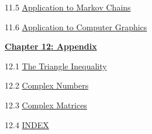 \documentclass{ximera}
\begin{document}
11.5	\href{https://ximera.osu.edu/linearalgebradzv3/LinearAlgebraInteractiveIntro/APP-0060/main}{Application to Markov Chains}
	
11.6	\href{https://ximera.osu.edu/linearalgebradzv3/LinearAlgebraInteractiveIntro/APP-0040/main}{Application to Computer Graphics}
	
\href{https://ximera.osu.edu/linearalgebradzv3/LinearAlgebraInteractiveIntro/XLAChapter_appendix/main}{\textbf{Chapter 12: Appendix}}
	
12.1	\href{https://ximera.osu.edu/linearalgebradzv3/LinearAlgebraInteractiveIntro/APX-0010/main}{The Triangle Inequality}
	
12.2	\href{https://ximera.osu.edu/linearalgebradzv3/LinearAlgebraInteractiveIntro/APX-0020/main}{Complex Numbers}
	
12.3
\href{https://ximera.osu.edu/linearalgebradzv3/LinearAlgebraInteractiveIntro/RTH-0050/main}{Complex Matrices}
	
12.4	\href{https://ximera.osu.edu/linearalgebradzv3/LinearAlgebraInteractiveIntro/INDEX/main}{INDEX}
\end{document}

